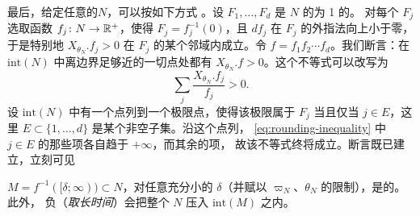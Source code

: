最后，给定任意\trCorneredBoundary{}的\trExactSymplectic\trManifold{}$N$，可以按如下方式%
\emph{\trRoundOffCorners}。设 $F_1,\ldots,F_d$ 是 $N$ 的\trCodimension{}为 1 的\trBoundaryFace。
对每个 $F_j$ 选取\trSmooth{}函数 $f_j\colon N\to\mathbb{R}^+$，使得 $F_j=f_j^{-1}(0)$，且 $df_j$ 在
$F_j$ 的外指法向上小于零，于是特别地 $X_{\theta_N}.f_j>0$ 在 $F_j$ 的某个邻域内成立。令
$f=f_1f_2\cdots f_d$。我们断言：在 $\mathrm{int}(N)$ 中离边界足够近的一切点处都有
$X_{\theta_N}.f>0$。这个不等式可以改写为
\begin{equation}\label{eq:rounding-inequality}
\sum_j\frac{X_{\theta_N}.f_j}{f_j}>0.
\end{equation}
设 $\mathrm{int}(N)$ 中有一个点列\trConvergence{}到一个极限点，使得该极限属于 $F_j$ 当且仅当
$j\in E$，这里 $E\subset\{1,\ldots,d\}$ 是某个非空子集。沿这个点列，
\eqref{eq:rounding-inequality} 中 $j\in E$ 的那些项各自趋于 $+\infty$，而其余的项\trBounded，
故该不等式终将成立。断言既已建立，立刻可见
\begin{lemma}\label{thm:rounding-lemma}
$M=f^{-1}([\delta;\infty))\subset N$，对任意充分小的 $\delta$（并赋以 $\varpi_N$、$\theta_N$
的限制），是\trContactTypeBoundary{}的\trExactSymplectic\trManifold。此外，
负\trLiouville\trFlow{}（\emph{取长时间}）会把整个 $N$ 压入 $\mathrm{int}(M)$ 之内。
\noqed
\end{lemma}
